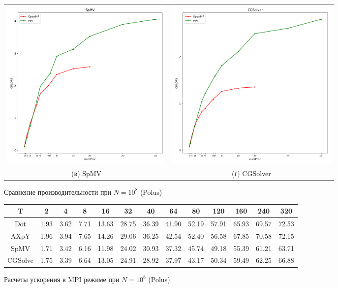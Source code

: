 \documentclass[12pt, a4paper]{article}
\begin{document}
\begin{figure}[H]
\begin{tabular}{cc}
		\includegraphics[width=85mm]{compare_spmv} & \includegraphics[width=85mm]{compare_cgsolver} \\
		(в) SpMV & (г) CGSolver \\[6pt]
	\end{tabular}
	\caption{Сравнение производительности при $N = 10^8$ (Polus)}
	\label{fig:mpi_flops_comapre} 
\end{figure}

\begin{figure}[H]
	\center
	\setlength{\tabcolsep}{6pt}
	\renewcommand{\arraystretch}{1.3}
	\begin{tabular}{|c|c|c|c|c|c|c|c|c|c|c|c|c|}
		\hline
		T & 2 & 4 & 8 & 16 & 32 & 40 & 64 & 80 & 120 & 160 & 240 & 320  \\
		\hline
		Dot & 1.93 & 3.62 & 7.71 & 13.63 & 28.75 & 36.39 & 41.90 & 52.19 & 57.91 & 65.93 & 69.57 & 72.53 \\
		\hline
		AXpY & 1.96 & 3.94 & 7.65 & 14.26 & 29.06 & 36.25 & 42.54 & 52.40 & 56.58 & 67.85 & 70.58 & 72.15  \\
		\hline
		SpMV & 1.71 & 3.42 & 6.16 & 11.98 & 24.02 & 30.93 & 37.32 & 45.74 & 49.18 & 55.39 & 61.21 & 63.71  \\
		\hline
		CGSolve & 1.75 & 3.39 & 6.64 & 13.05 & 24.91 & 28.92 & 37.97 & 43.17 & 50.34 & 59.49 & 62.25 & 66.88 \\
		\hline
	\end{tabular}
	\caption{Расчеты ускорения в MPI режиме при $N = 10^8$ (Polus)}
	\label{fig:speedup3}
\end{figure}
\end{document}

